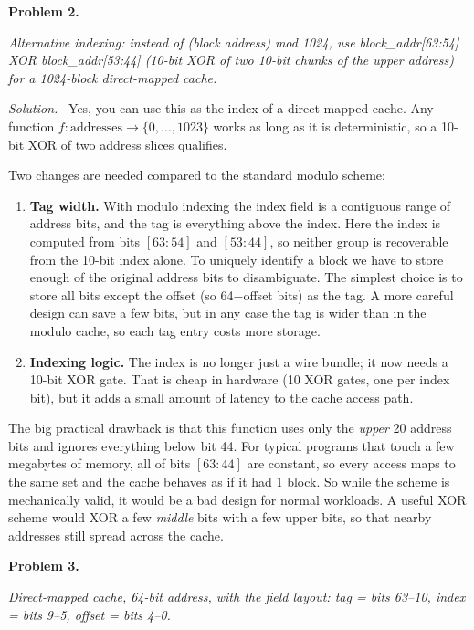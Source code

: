 \documentclass[12pt]{article}
\newcommand{\problem}[1]{\vspace{0.8em}\noindent\textbf{Problem #1.}\vspace{0.35em}}
\newenvironment{solution}{\par\noindent\textit{Solution.}\ }{\par\vspace{1.1em}}
\newcommand{\assigntext}[1]{\par\vspace{0.25em}\small\textit{#1}\par\vspace{0.35em}}
\begin{document}
\problem{2}
\assigntext{Alternative indexing: instead of \emph{(block address) mod 1024}, use \emph{block\_addr[63:54] XOR block\_addr[53:44]} (10-bit XOR of two 10-bit chunks of the upper address) for a 1024-block direct-mapped cache.}

\begin{solution}
Yes, you can use this as the index of a direct-mapped cache. Any function $f:\text{addresses}\to\{0,\ldots,1023\}$ works as long as it is deterministic, so a 10-bit XOR of two address slices qualifies.

Two changes are needed compared to the standard modulo scheme:
\begin{enumerate}
    \item \textbf{Tag width.} With modulo indexing the index field is a contiguous range of address bits, and the tag is everything above the index. Here the index is computed from bits $[63\!:\!54]$ and $[53\!:\!44]$, so neither group is recoverable from the 10-bit index alone. To uniquely identify a block we have to store enough of the original address bits to disambiguate. The simplest choice is to store all bits except the offset (so 64$-$offset bits) as the tag. A more careful design can save a few bits, but in any case the tag is wider than in the modulo cache, so each tag entry costs more storage.
    \item \textbf{Indexing logic.} The index is no longer just a wire bundle; it now needs a 10-bit XOR gate. That is cheap in hardware (10 XOR gates, one per index bit), but it adds a small amount of latency to the cache access path.
\end{enumerate}

The big practical drawback is that this function uses only the \emph{upper} 20 address bits and ignores everything below bit 44. For typical programs that touch a few megabytes of memory, all of bits $[63\!:\!44]$ are constant, so every access maps to the same set and the cache behaves as if it had 1 block. So while the scheme is mechanically valid, it would be a bad design for normal workloads. A useful XOR scheme would XOR a few \emph{middle} bits with a few upper bits, so that nearby addresses still spread across the cache.
\end{solution}

\problem{3}
\assigntext{Direct-mapped cache, 64-bit address, with the field layout: tag = bits 63--10, index = bits 9--5, offset = bits 4--0.}
\end{document}
